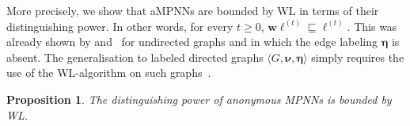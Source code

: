 \documentclass[10pt,a4paper]{article}
\newtheorem{proposition}{Proposition}[section]
\theoremstyle{definition}
\begin{document}
More precisely, we show that aMPNNs are bounded by WL in terms of their distinguishing power. In other words, for every $t\geq 0$, $\mathbf{w}\pmb{\ell}^{(t)}\sqsubseteq \pmb{\ell}^{(t)}$. This was already shown  by \citet{XuHLJ19} and~\citet{grohewl} for undirected graphs and in which the edge labeling $\pmb{\eta}$ is absent. The generalisation to labeled directed graphs $\langle G,\pmb{\nu},\pmb{\eta}\rangle$ simply requires the use of the WL-algorithm on such graphs~\citep{}.
%
\begin{proposition}\label{prop:WL}
	The distinguishing power of anonymous MPNNs is bounded by WL.
\end{proposition}
\end{document}
